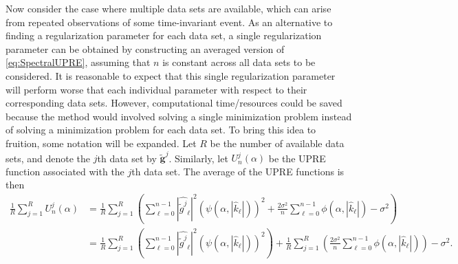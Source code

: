 \documentclass[12pt,notitlepage]{report}
\newcommand{\gnoise}{\widetilde{g}}	%
\newcommand{\gnoiseVec}{\widetilde{\mathbf{g}}}	%
\newcommand{\regparam}{\alpha}
\newcommand{\filt}{\phi}
\newcommand{\mfilt}{\psi}
\newcommand{\noiseSD}{\sigma}	%
\newcommand{\U}{U}	%
\begin{document}
Now consider the case where multiple data sets are available, which can arise from repeated observations of some time-invariant event. As an alternative to finding a regularization parameter for each data set, a single regularization parameter can be obtained by constructing an averaged version of \eqref{eq:SpectralUPRE}, assuming that $n$ is constant across all data sets to be considered. It is reasonable to expect that this single regularization parameter will perform worse that each individual parameter with respect to their corresponding data sets. However, computational time/resources could be saved because the method would involved solving a single minimization problem instead of solving a minimization problem for each data set. To bring this idea to fruition, some notation will be expanded. Let $R$ be the number of available data sets, and denote the $j$th data set by $\gnoiseVec^j$. Similarly, let $\U_n^j(\regparam)$ be the UPRE function associated with the $j$th data set.  The average of the UPRE functions is then 
\begin{align*}
\frac{1}{R}\sum_{j=1}^R \U_n^j(\regparam) &= \frac{1}{R}\sum_{j=1}^R \left(\sum_{\ell = 0}^{n-1} |\widehat{\gnoise^j}_\ell|^2(\mfilt(\regparam,|\widehat{k}_\ell|))^2 + \frac{2\noiseSD^2}{n}\sum_{\ell = 0}^{n-1} \filt(\regparam,|\widehat{k}_\ell|) - \noiseSD^2\right) \\
&= \frac{1}{R}\sum_{j=1}^R \left(\sum_{\ell = 0}^{n-1} |\widehat{\gnoise^j}_\ell|^2(\mfilt(\regparam,|\widehat{k}_\ell|))^2\right) + \frac{1}{R}\sum_{j=1}^R \left(\frac{2\noiseSD^2}{n}\sum_{\ell = 0}^{n-1} \filt(\regparam,|\widehat{k}_\ell|)\right) - \noiseSD^2.
\end{align*}
\end{document}
